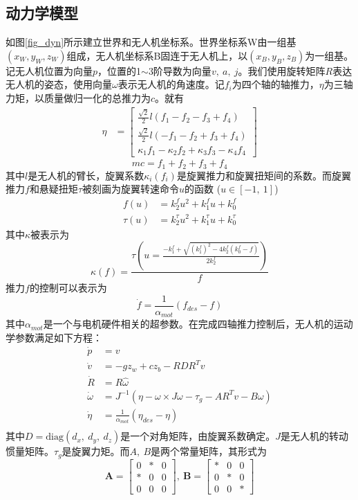 \subsection{动力学模型}
如图\ref{fig_dyn}所示建立世界和无人机坐标系。世界坐标系W由一组基$(x_W, y_W, z_W)$组成，无人机坐标系B固连于无人机上，以$(x_B, y_B, z_B)$为一组基。记无人机位置为向量$p$，位置的1$\sim$3阶导数为向量$v,\ a,\ j$。我们使用旋转矩阵$R$表达无人机的姿态，使用向量$\omega$表示无人机的角速度。记$f_i$为四个轴的轴推力，$\eta$为三轴力矩，以质量做归一化的总推力为$c$。就有
\[
    \begin{aligned}
        \eta & = \left[\begin{array}{c}
        \frac{\sqrt{2}}{2} l\left(f_{1}-f_{2}-f_{3}+f_{4}\right) \\
        \frac{\sqrt{2}}{2} l\left(-f_{1}-f_{2}+f_{3}+f_{4}\right) \\
        \kappa_{1} f_{1}-\kappa_{2} f_{2}+\kappa_{3} f_{3}-\kappa_{4} f_{4}
        \end{array}\right]
        \end{aligned}
\]
\[
    mc = f_1+f_2+f_3+f_4
\]
其中$l$是无人机的臂长，旋翼系数$\kappa_i(f_i)$是旋翼推力和旋翼扭矩间的系数。而旋翼推力$f$和悬疑扭矩$\tau$被刻画为旋翼转速命令$u$的函数 ($u\in[-1,\ 1]$)
\[
    \begin{aligned}
    f(u) & = k_{2}^{f} u^{2}+k_{1}^{f} u+k_{0}^{f} \\
    \tau(u) & = k_{2}^{\tau} u^{2}+k_{1}^{\tau} u+k_{0}^{\tau}
    \end{aligned}
\]
其中$\kappa$被表示为
\[
    \kappa(f)=\frac{\tau\left(u=\frac{-k_{1}^{f}+\sqrt{\left(k_{1}^{f}\right)^{2}-4 k_{2}^{f}\left(k_{0}^{f}-f\right)}}{2 k_{2}^{f}}\right)}{f}
\]
推力$f$的控制可以表示为
\[
    \dot{f} = \frac{1}{\alpha_{mot}}(f_{des}-f)
\]
其中$\alpha_{mot}$是一个与电机硬件相关的超参数。在完成四轴推力控制后，无人机的运动学参数满足如下方程：
\[\begin{aligned}
    \dot{p} &= v\\
    \dot{v} &= -gz_w+cz_b-RDR^T v\\
    \dot{R} &= R\hat{\omega}\\
    \dot{\omega} &= J^{-1}(\eta-\omega\times J\omega-\tau_g-AR^T v-B\omega)\\
    \dot{\eta} &= \frac{1}{\alpha_{mot}}(\eta_{des}-\eta)\\
\end{aligned}\]
其中$D = \text{diag}(d_x,\ d_y,\ d_z)$是一个对角矩阵，由旋翼系数确定。$J$是无人机的转动惯量矩阵。$\tau_g$是旋翼力矩。而$A,\ B$是两个常量矩阵，其形式为
\[
    \mathbf{A}=\left[\begin{array}{ccc}
        0 & * & 0 \\
        * & 0 & 0 \\
        0 & 0 & 0
        \end{array}\right],\ \mathbf{B}=\left[\begin{array}{ccc}
            * & 0 & 0 \\
            0 & * & 0 \\
            0 & 0 & *
        \end{array}\right]
\]

